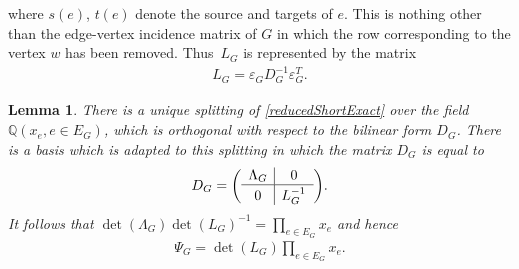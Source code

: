 \documentclass[pdftex]{sigma}%
\newtheorem{lem}[thm]{Lemma}
\numberwithin{equation}{section}
\newcommand{\Q}{\mathbb Q}
\newcommand{\0}{\color{blue}{\mathsf{0}}}
\begin{document}
where $s(e)$, $t(e)$ denote the source and targets of $e$. This is nothing other than the edge-vertex incidence matrix of $G$ in which the row corresponding to the vertex $w$ has been removed. Thus~$L_G$ is represented by the matrix
 \begin{gather} \label{LGdefn}
 L_G = \varepsilon_G D^{-1}_G \varepsilon_G^T .
 \end{gather}

 \begin{lem} \label{lem: DGdirectsum}
 There is a unique splitting of \eqref{reducedShortExact} over the field $\Q(x_e, e\in E_G)$, which is orthogonal with respect to the bilinear form $D_G$. There is a basis which is adapted to this splitting in which the matrix $D_G$ is equal to
\begin{gather*} %
D_G = \left(
\begin{array}{c|c}
 \Lambda_G & 0 \\ \hline
 0 & L_G^{-1^{\vphantom{1}}} \\
\end{array}
\right)\!.
\end{gather*}
It follows that $\det(\Lambda_G) \det(L_G)^{-1} = \prod_{e \in E_G} x_e$ and hence
\begin{gather*}
\Psi_G = \det(L_G) \prod_{e \in E_G} x_e.
\end{gather*}
\end{lem}
\end{document}
